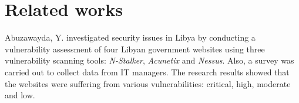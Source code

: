 \documentclass[conference]{IEEEtran}
\begin{document}
%



\section{Related works}

Abuzawayda, Y.\cite{IJIR3439} investigated security
issues in Libya by conducting a vulnerability
assessment of four Libyan government websites
using three vulnerability scanning tools: \emph{N-Stalker},
\emph{Acunetix} and \emph{Nessus}. Also, a survey was carried out
to collect data from IT managers. The research
results showed that the websites were suffering from
various vulnerabilities: critical, high, moderate and
low.
\end{document}

